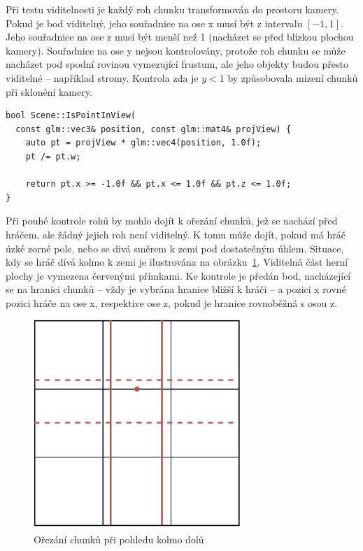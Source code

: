 \documentclass[thesis=M,czech]{FITthesis}[2019/12/23]
\begin{document}
Při testu viditelnosti je každý roh chunku transformován do prostoru kamery. Pokud je bod viditelný, jeho souřadnice na ose x musí být z intervalu $[-1, 1]$. Jeho souřadnice na ose z musí být menší než 1 (nacházet se před blízkou plochou kamery). Souřadnice na ose y nejsou kontrolovány, protože roh chunku se může nacházet pod spodní rovinou vymezující frustum, ale jeho objekty budou přesto viditelné -- například stromy. Kontrola zda je $y < 1$ by způsobovala mizení chunků při sklonění kamery.

\begin{verbatim}
bool Scene::IsPointInView(
  const glm::vec3& position, const glm::mat4& projView) {
    auto pt = projView * glm::vec4(position, 1.0f);
    pt /= pt.w;

    return pt.x >= -1.0f && pt.x <= 1.0f && pt.z <= 1.0f;
}
\end{verbatim}

Při pouhé kontrole rohů by mohlo dojít k ořezání chunků, jež se nachází před hráčem, ale žádný jejich roh není viditelný. K tomu může dojít, pokud má hráč úzké zorné pole, nebo se divá směrem k zemi pod dostatečným úhlem. Situace, kdy se hráč dívá kolmo k zemi je ilustrována na obrázku~\ref{fig:visible_chunks_down}. Viditelná část herní plochy je vymezena červenými přímkami. Ke kontrole je předán bod, nacházející se na hranici chunků -- vždy je vybrána hranice bližší k hráči -- a pozici x rovné pozici hráče na ose x, respektive ose z, pokud je hranice rovnoběžná s osou z.

\begin{figure}\centering
	\includegraphics[width=0.7\textwidth]{images/visible_chunks_camera_down}
	\caption[Ořezání chunků při pohledu kolmo dolů]{Ořezání chunků při pohledu kolmo dolů}\label{fig:visible_chunks_down}
\end{figure}
\end{document}
